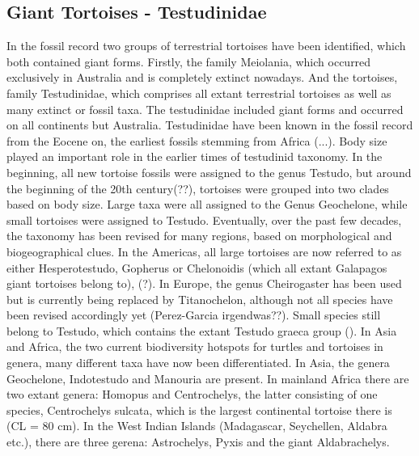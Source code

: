 


\subsection{Giant Tortoises - Testudinidae}
In the fossil record two groups of terrestrial tortoises have been identified, which both contained giant forms. Firstly, the family Meiolania, which occurred exclusively in Australia and is completely extinct nowadays. And the tortoises, family Testudinidae, which comprises all extant terrestrial tortoises as well as many extinct or fossil taxa. The testudinidae included giant forms and occurred on all continents but Australia.
Testudinidae have been known in the fossil record from the Eocene on, the earliest fossils stemming from Africa (...).
Body size played an important role in the earlier times of testudinid taxonomy. In the beginning, all new tortoise fossils were assigned to the genus Testudo, but around the beginning of the 20th century(??), tortoises were grouped into two clades based on body size. Large taxa were all assigned to the Genus Geochelone, while small tortoises were assigned to Testudo.
Eventually, over the past few decades, the taxonomy has been revised for many regions, based on morphological and biogeographical clues. In the Americas, all large tortoises are now referred to as either Hesperotestudo, Gopherus or Chelonoidis (which all extant Galapagos giant tortoises belong to), (?). In Europe, the genus Cheirogaster has been used but is currently being replaced by Titanochelon, although not all species have been revised accordingly yet (Perez-Garcia irgendwas??). Small species still belong to Testudo, which contains the extant Testudo graeca group ().
In Asia and Africa, the two current biodiversity hotspots for turtles and tortoises in genera, many different taxa have now been differentiated.
In Asia, the genera Geochelone, Indotestudo and Manouria are present. In mainland Africa there are two extant genera: Homopus and Centrochelys, the latter consisting of one species, Centrochelys sulcata, which is the largest continental tortoise there is (CL = 80 cm). In the West Indian Islands (Madagascar, Seychellen, Aldabra etc.), there are three gerena: Astrochelys, Pyxis and the giant Aldabrachelys.

